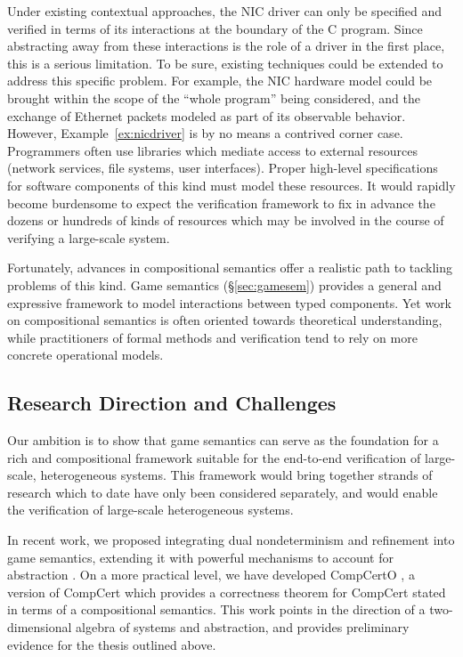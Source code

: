 Under existing contextual approaches, the NIC driver can only be
specified and verified in terms of its interactions at the boundary of
the C program.  Since abstracting away from these interactions is
the role of a driver in the first place, this is a serious limitation.
To be sure, existing techniques could be extended to address this
specific problem.  For example, the NIC hardware model could be
brought within the scope of the ``whole program'' being considered,
and the exchange of Ethernet packets modeled as part of its observable
behavior.
However,
Example~\ref{ex:nicdriver} is by no means a contrived corner case.
Programmers often use libraries which mediate access to
external resources (network services, file systems, user interfaces).
Proper high-level specifications for software components of this kind
must model these resources.  It would rapidly become burdensome to
expect the verification framework to fix in advance the dozens or
hundreds of kinds of resources which may be involved in the course of
verifying a large-scale system.

Fortunately, advances in compositional semantics offer a realistic
path to tackling problems of this kind.
Game semantics
(\S\ref{sec:gamesem}) provides a general and expressive framework to
model interactions between typed components.
Yet work on compositional semantics
is often oriented towards theoretical understanding,
while practitioners of formal methods and verification
tend to rely on more concrete operational models.

\subsection{Research Direction and Challenges}

Our ambition is to show that %
game semantics
can serve as the foundation
for a rich and compositional framework
suitable for the end-to-end verification of
large-scale, heterogeneous systems.
This framework would
bring together strands of research
which to date have only been considered separately,
and would enable
the verification of large-scale heterogeneous systems.

In recent work, we proposed
integrating dual nondeterminism and refinement into game semantics,
extending it with powerful mechanisms to account for abstraction
\cite{koenig20,layered22}.
On a more practical level,
we have developed CompCertO \cite{compcerto},
a version of CompCert which
provides a correctness theorem for CompCert
stated in terms of a compositional semantics.
This work points in the direction of a two-dimensional algebra 
of systems and abstraction, and
provides preliminary evidence
for the thesis outlined above.

